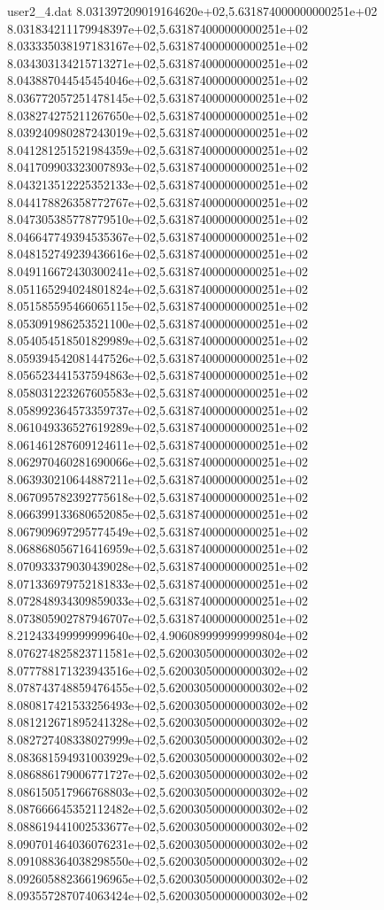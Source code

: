 \begin{filecontents}{user2_4.dat}
8.031397209019164620e+02,5.631874000000000251e+02
8.031834211179948397e+02,5.631874000000000251e+02
8.033335038197183167e+02,5.631874000000000251e+02
8.034303134215713271e+02,5.631874000000000251e+02
8.043887044545454046e+02,5.631874000000000251e+02
8.036772057251478145e+02,5.631874000000000251e+02
8.038274275211267650e+02,5.631874000000000251e+02
8.039240980287243019e+02,5.631874000000000251e+02
8.041281251521984359e+02,5.631874000000000251e+02
8.041709903323007893e+02,5.631874000000000251e+02
8.043213512225352133e+02,5.631874000000000251e+02
8.044178826358772767e+02,5.631874000000000251e+02
8.047305385778779510e+02,5.631874000000000251e+02
8.046647749394535367e+02,5.631874000000000251e+02
8.048152749239436616e+02,5.631874000000000251e+02
8.049116672430300241e+02,5.631874000000000251e+02
8.051165294024801824e+02,5.631874000000000251e+02
8.051585595466065115e+02,5.631874000000000251e+02
8.053091986253521100e+02,5.631874000000000251e+02
8.054054518501829989e+02,5.631874000000000251e+02
8.059394542081447526e+02,5.631874000000000251e+02
8.056523441537594863e+02,5.631874000000000251e+02
8.058031223267605583e+02,5.631874000000000251e+02
8.058992364573359737e+02,5.631874000000000251e+02
8.061049336527619289e+02,5.631874000000000251e+02
8.061461287609124611e+02,5.631874000000000251e+02
8.062970460281690066e+02,5.631874000000000251e+02
8.063930210644887211e+02,5.631874000000000251e+02
8.067095782392775618e+02,5.631874000000000251e+02
8.066399133680652085e+02,5.631874000000000251e+02
8.067909697295774549e+02,5.631874000000000251e+02
8.068868056716416959e+02,5.631874000000000251e+02
8.070933379030439028e+02,5.631874000000000251e+02
8.071336979752181833e+02,5.631874000000000251e+02
8.072848934309859033e+02,5.631874000000000251e+02
8.073805902787946707e+02,5.631874000000000251e+02
8.212433499999999640e+02,4.906089999999999804e+02
8.076274825823711581e+02,5.620030500000000302e+02
8.077788171323943516e+02,5.620030500000000302e+02
8.078743748859476455e+02,5.620030500000000302e+02
8.080817421533256493e+02,5.620030500000000302e+02
8.081212671895241328e+02,5.620030500000000302e+02
8.082727408338027999e+02,5.620030500000000302e+02
8.083681594931003929e+02,5.620030500000000302e+02
8.086886179006771727e+02,5.620030500000000302e+02
8.086150517966768803e+02,5.620030500000000302e+02
8.087666645352112482e+02,5.620030500000000302e+02
8.088619441002533677e+02,5.620030500000000302e+02
8.090701464036076231e+02,5.620030500000000302e+02
8.091088364038298550e+02,5.620030500000000302e+02
8.092605882366196965e+02,5.620030500000000302e+02
8.093557287074063424e+02,5.620030500000000302e+02

\end{filecontents}
